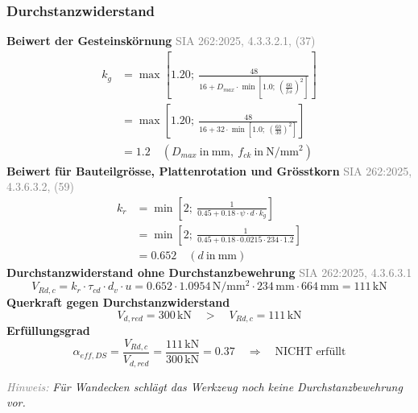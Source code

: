 \documentclass[11pt,a4paper]{article}
\newcommand{\normref}[1]{{\small\textcolor{gray}{#1}}}
\newcommand{\hinweis}[2]{\par\noindent\textcolor{gray}{\textit{#1:}} \textit{#2}\par}
\begin{document}
\subsubsection{Durchstanzwiderstand}
\noindent\textbf{Beiwert der Gesteinskörnung} \hfill \normref{SIA 262:2025, 4.3.3.2.1, (37)}
\begin{equation*}
\begin{aligned}
  k_g &= \max\left[1.20;\ \frac{48}{16 + D_{max} \cdot \min\left[1.0;\ \left(\frac{60}{f_{ck}}\right)^{2}\right]}\right] \\
  &= \max\left[1.20;\ \frac{48}{16 + 32 \cdot \min\left[1.0;\ \left(\frac{60}{30}\right)^{2}\right]}\right] \\
  &= 1.2 \quad \left(D_{max}\ \text{in}\ \mathrm{mm},\ f_{ck}\ \text{in}\ \mathrm{N}/\mathrm{mm}^{2}\right)
\end{aligned}
\end{equation*}
\noindent\textbf{Beiwert für Bauteilgrösse, Plattenrotation und Grösstkorn} \hfill \normref{SIA 262:2025, 4.3.6.3.2, (59)}
\begin{equation*}
\begin{aligned}
  k_r &= \min\left[2;\ \frac{1}{0.45 + 0.18 \cdot \psi \cdot d \cdot k_g}\right] \\
  &= \min\left[2;\ \frac{1}{0.45 + 0.18 \cdot 0.0215 \cdot 234 \cdot 1.2}\right] \\
  &= 0.652 \quad \left(d\ \text{in}\ \mathrm{mm}\right)
\end{aligned}
\end{equation*}
\noindent\textbf{Durchstanzwiderstand ohne Durchstanzbewehrung} \hfill \normref{SIA 262:2025, 4.3.6.3.1}
\begin{equation*}
V_{Rd,c} = k_r \cdot \tau_{cd} \cdot d_v \cdot u = 0.652 \cdot 1.0954\,\mathrm{N}/\mathrm{mm}^{2} \cdot 234\,\mathrm{mm} \cdot 664\,\mathrm{mm} = 111\,\mathrm{kN}
\end{equation*}
\noindent\textbf{Querkraft gegen Durchstanzwiderstand}
\begin{equation*}
V_{d,red} = 300\,\mathrm{kN} \quad > \quad V_{Rd,c} = 111\,\mathrm{kN}
\end{equation*}
\noindent\textbf{Erfüllungsgrad}
\begin{equation*}
\alpha_{eff,DS} = \frac{V_{Rd,c}}{V_{d,red}} = \frac{111\,\mathrm{kN}}{300\,\mathrm{kN}} = 0.37 \quad \Rightarrow \quad \text{NICHT erfüllt}
\end{equation*}
\hinweis{Hinweis}{Für Wandecken schlägt das Werkzeug noch keine Durchstanzbewehrung vor.}
\end{document}
